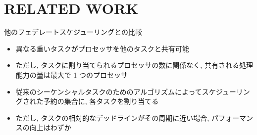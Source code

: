 
\section{RELATED WORK}
\label{sec: related work}

\begin{frame}{他のフェデレートスケジューリングとの比較}
    \begin{block}{\cite{jiang2017semi}}
        \setlength{\linewidth}{0.98\columnwidth}
        \begin{itemize}
            \item 異なる重いタスクがプロセッサを他のタスクと共有可能
            \item ただし, タスクに割り当てられるプロセッサの数に関係なく, 共有される処理能力の量は最大で 1 つのプロセッサ
        \end{itemize}
    \end{block}
    \begin{block}{\cite{ueter2018reservation}}
        \setlength{\linewidth}{0.98\columnwidth}
        \begin{itemize}
            \item 従来のシーケンシャルタスクのためのアルゴリズムによってスケジューリングされた予約の集合に, 各タスクを割り当てる
            \item ただし, タスクの相対的なデッドラインがその周期に近い場合, パフォーマンスの向上はわずか
        \end{itemize}
    \end{block}
\end{frame}

